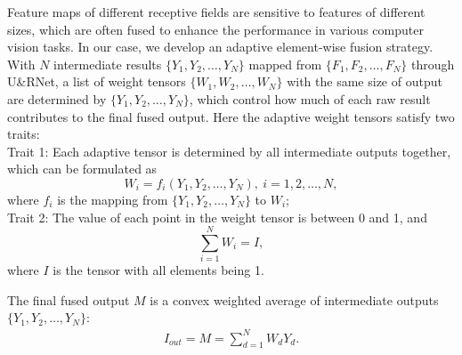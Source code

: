 \documentclass[journal]{IEEEtran}
\begin{document}
Feature maps of different receptive fields are sensitive to features of different sizes, which are often fused to enhance the performance in various computer vision tasks. In our case, we develop an adaptive element-wise fusion strategy. With $N$ intermediate results $\{Y_{1},Y_{2},\dots,Y_{N} \}$ mapped from $\{F_{1},F_{2},\dots,F_{N} \}$ through U\&RNet, a list of weight tensors $\{W_{1},W_{2},\dots,W_{N}\}$ with the same size of output are determined by $\{Y_{1},Y_{2},\dots,Y_{N} \}$, which control how much of each raw result contributes to the final fused output. Here the adaptive weight tensors satisfy two traits:\\
Trait 1: Each adaptive tensor is determined by all intermediate outputs together, which can be formulated as
\begin{equation}
W_{i} = f_{i}(Y_{1},Y_{2},\dots,Y_{N}) , \ i = 1, 2, \dots, N,
\label{eq:trait1}
\end{equation}
where $f_{i}$ is the mapping from $\{Y_{1}, Y_{2}, \dots, Y_{N}\}$ to $W_{i}$;\\
Trait 2: The value of each point in the weight tensor is between 0 and 1, and
\begin{equation}
\sum_{i=1}^{N}W_{i}=I,
\label{eq:trait2}
\end{equation}
where $I$ is the tensor with all elements being 1. 

The final fused output $M$ is a convex weighted average of intermediate outputs $\{Y_{1},Y_{2},\dots,Y_{N} \}$: 
\begin{equation}
\begin{split}
I_{out}=M=\sum_{d=1}^{N}W_{d}Y_{d}.
\end{split}
\label{con:over_4}
\end{equation}
\end{document}
